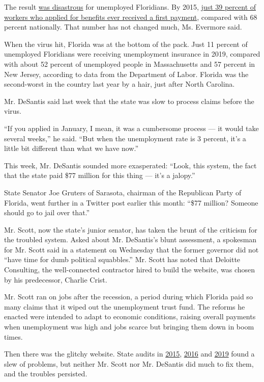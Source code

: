 The result
\href{https://www.nytimes.com/2014/01/11/us/floridas-site-said-to-delay-millions-in-aid-to-jobless.html}{was
disastrous} for unemployed Floridians. By 2015,
\href{https://s27147.pcdn.co/wp-content/uploads/Aint-No-Sunshine-Florida-Unemployment-Insurance.pdf}{just
39 percent of workers who applied for benefits ever received a first
payment}, compared with 68 percent nationally. That number has not
changed much, Ms. Evermore said.

When the virus hit, Florida was at the bottom of the pack. Just 11
percent of unemployed Floridians were receiving unemployment insurance
in 2019, compared with about 52 percent of unemployed people in
Massachusetts and 57 percent in New Jersey, according to data from the
Department of Labor. Florida was the second-worst in the country last
year by a hair, just after North Carolina.

Mr. DeSantis said last week that the state was slow to process claims
before the virus.

``If you applied in January, I mean, it was a cumbersome process --- it
would take several weeks,'' he said. ``But when the unemployment rate is
3 percent, it's a little bit different than what we have now.''

This week, Mr. DeSantis sounded more exasperated: ``Look, this system,
the fact that the state paid \$77 million for this thing --- it's a
jalopy.''

State Senator Joe Gruters of Sarasota, chairman of the Republican Party
of Florida, went further in a Twitter post earlier this month: ``\$77
million? Someone should go to jail over that.''

Mr. Scott, now the state's junior senator, has taken the brunt of the
criticism for the troubled system. Asked about Mr. DeSantis's blunt
assessment, a spokesman for Mr. Scott said in a statement on Wednesday
that the former governor did not ``have time for dumb political
squabbles.'' Mr. Scott has noted that Deloitte Consulting, the
well-connected contractor hired to build the website, was chosen by his
predecessor, Charlie Crist.

Mr. Scott ran on jobs after the recession, a period during which Florida
paid so many claims that it wiped out the unemployment trust fund. The
reforms he enacted were intended to adapt to economic conditions,
raising overall payments when unemployment was high and jobs scarce but
bringing them down in boom times.

Then there was the glitchy website. State audits in
\href{https://flauditor.gov/pages/pdf_files/2015-107.pdf}{2015},
\href{https://flauditor.gov/pages/pdf_files/2017-039.pdf}{2016} and
\href{https://flauditor.gov/pages/pdf_files/2019-183.pdf}{2019} found a
slew of problems, but neither Mr. Scott nor Mr. DeSantis did much to fix
them, and the troubles persisted.

